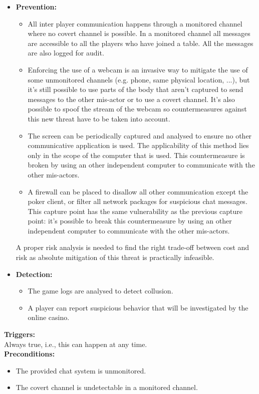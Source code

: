\documentclass[a4paper,11pt]{report}
\begin{document}
\begin{itemize}
\item \textbf{Prevention:}
\begin{itemize}
\item All inter player communication happens through a monitored channel where no covert channel is possible. In a monitored channel all messages are accessible to all the players who have joined a table. All the messages are also logged for audit.
\item Enforcing the use of a webcam is an invasive way to mitigate the use of some unmonitored channels (e.g. phone, same physical location, ...), but it's still possible to use parts of the body that aren't captured to send messages to the other mis-actor or to use a covert channel. It's also possible to spoof the stream of the webcam so countermeasures against this new threat have to be taken into account.
\item The screen can be periodically captured and analysed to ensure no other communicative application is used. The applicability of this method lies only in the scope of the computer that is used. This countermeasure is broken by using an other independent computer to communicate with the other mis-actors.
\item A firewall can be placed to disallow all other communication except the poker client, or filter all network packages for suspicious chat messages. This capture point has the same vulnerability as the previous capture point: it's possible to break this countermeasure by using an other independent computer to communicate with the other mis-actors.
\end{itemize}
A proper risk analysis is needed to find the right trade-off between cost and risk as absolute mitigation of this threat is practically infeasible.
\item \textbf{Detection:}
\begin{itemize}
\item The game logs are analysed to detect collusion.
\item A player can report suspicious behavior that will be investigated by the online casino.
\end{itemize}
\end{itemize}
\textbf{Triggers:}\\
Always true, i.e., this can happen at any time. \\
\textbf{Preconditions:}
\begin{itemize}
\item The provided chat system is unmonitored.
\item The covert channel is undetectable in a monitored channel.
\end{itemize}
\end{document}
